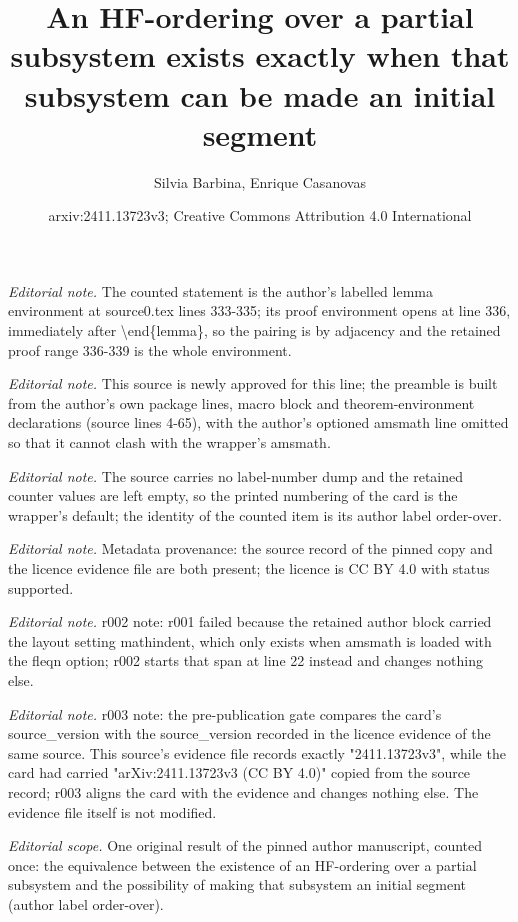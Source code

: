 \documentclass[10pt,a4paper]{article}
\title{An HF-ordering over a partial subsystem exists exactly when that subsystem can be made an initial segment}
\author{Silvia Barbina, Enrique Casanovas}
\date{arxiv:2411.13723v3; Creative Commons Attribution 4.0 International}
\theoremstyle{note}
\begin{document}
\maketitle
\noindent\textit{Editorial note.} The counted statement is the author's labelled lemma environment at source0.tex lines 333-335; its proof environment opens at line 336, immediately after \textbackslash{}end\{lemma\}, so the pairing is by adjacency and the retained proof range 336-339 is the whole environment.\par\medskip
\noindent\textit{Editorial note.} This source is newly approved for this line; the preamble is built from the author's own package lines, macro block and theorem-environment declarations (source lines 4-65), with the author's optioned amsmath line omitted so that it cannot clash with the wrapper's amsmath.\par\medskip
\noindent\textit{Editorial note.} The source carries no label-number dump and the retained counter values are left empty, so the printed numbering of the card is the wrapper's default; the identity of the counted item is its author label order-over.\par\medskip
\noindent\textit{Editorial note.} Metadata provenance: the source record of the pinned copy and the licence evidence file are both present; the licence is CC BY 4.0 with status supported.\par\medskip
\noindent\textit{Editorial note.} r002 note: r001 failed because the retained author block carried the layout setting mathindent, which only exists when amsmath is loaded with the fleqn option; r002 starts that span at line 22 instead and changes nothing else.\par\medskip
\noindent\textit{Editorial note.} r003 note: the pre-publication gate compares the card's source\_version with the source\_version recorded in the licence evidence of the same source. This source's evidence file records exactly "2411.13723v3", while the card had carried "arXiv:2411.13723v3 (CC BY 4.0)" copied from the source record; r003 aligns the card with the evidence and changes nothing else. The evidence file itself is not modified.\par\medskip
\noindent\textit{Editorial scope.} One original result of the pinned author manuscript, counted once: the equivalence between the existence of an HF-ordering over a partial subsystem and the possibility of making that subsystem an initial segment (author label order-over).\par\medskip
\end{document}
